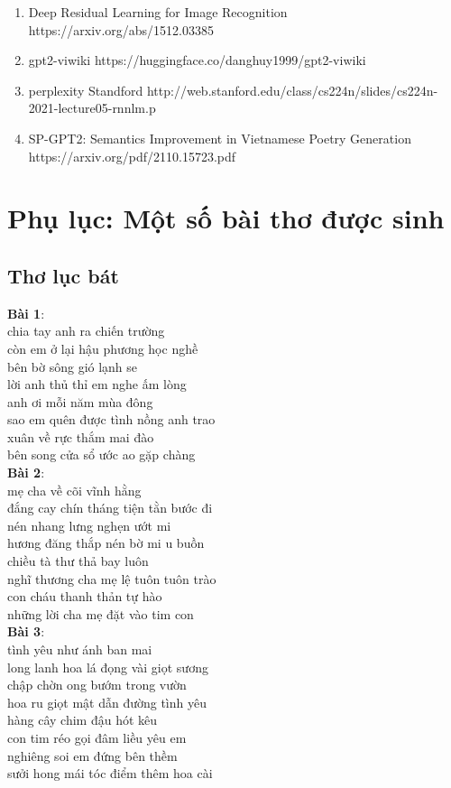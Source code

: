 \documentclass[a4paper]{article}
\theoremstyle{definition}
\begin{document}
\begin{enumerate}[ 1.]
\item Deep Residual Learning for Image Recognition https://arxiv.org/abs/1512.03385
\item gpt2-viwiki https://huggingface.co/danghuy1999/gpt2-viwiki
\item perplexity Standford http://web.stanford.edu/class/cs224n/slides/cs224n-2021-lecture05-rnnlm.p
\item SP-GPT2: Semantics Improvement in Vietnamese
Poetry Generation https://arxiv.org/pdf/2110.15723.pdf
\end{enumerate}
\newpage
\section{Phụ lục: Một số bài thơ được sinh}
\subsection{Thơ lục bát}
\textbf{Bài 1}: \\
 chia tay anh ra chiến trường \\
 còn em ở lại hậu phương học nghề \\
 bên bờ sông gió lạnh se \\
 lời anh thủ thỉ em nghe ấm lòng \\
anh ơi mỗi năm mùa đông \\
 sao em quên được tình nồng anh trao \\
xuân về rực thắm mai đào \\
 bên song cửa sổ ước ao gặp chàng\\
\textbf{Bài 2}:\\
mẹ cha về cõi vĩnh hằng \\
 đắng cay chín tháng tiện tằn bước đi \\
  nén nhang lưng nghẹn ướt mi \\
 hương đăng thắp nén bờ mi u buồn \\
chiều tà thư thả bay luôn \\
 nghĩ thương cha mẹ lệ tuôn tuôn trào \\
 con cháu thanh thản tự hào \\
 những lời cha mẹ đặt vào tim con\\
\textbf{Bài 3}: \\
tình yêu như ánh ban mai \\
 long lanh hoa lá đọng vài giọt sương \\
chập chờn ong bướm trong vườn \\
 hoa ru giọt mật dẫn đường tình yêu \\
hàng cây chim đậu hót kêu \\
 con tim réo gọi đâm liều yêu em \\
nghiêng soi em đứng bên thềm \\
 sưởi hong mái tóc điểm thêm hoa cài\\
\end{document}
